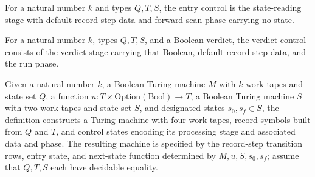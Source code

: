 \begin{definition}
\label{Turing.recordStepEntry}
\leanok
{}
For a natural number $k$ and types $Q,T,S$, the entry control is the state-reading stage
with default record-step data and forward scan phase carrying no state.
\end{definition}

\begin{definition}
\label{Turing.recordStepVerdict}
\leanok
{}
For a natural number $k$, types $Q,T,S$, and a Boolean verdict, the verdict control
consists of the verdict stage carrying that Boolean, default record-step data, and the
run phase.
\end{definition}

\begin{definition}
\label{Turing.recordStepMachine}
\leanok
{}
Given a natural number $k$, a Boolean Turing machine $M$ with $k$ work tapes and state
set $Q$, a function $u:T\times\mathrm{Option}(\mathrm{Bool})\to T$, a Boolean Turing
machine $S$ with two work tapes and state set $S$, and designated states $s_0,s_f\in S$,
the definition constructs a Turing machine with four work tapes, record symbols built
from $Q$ and $T$, and control states encoding its processing stage and associated data
and phase. The resulting machine is specified by the record-step transition rows, entry
state, and next-state function determined by $M,u,S,s_0,s_f$; assume that $Q,T,S$ each
have decidable equality.
\end{definition}

